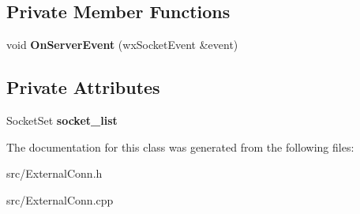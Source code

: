 \subsection*{Private Member Functions}
\begin{DoxyCompactItemize}
\item 
void {\bfseries OnServerEvent} (wxSocketEvent \&event)\label{classExternalConn_a232a60e38f703be5f0664108cb80ee33}

\end{DoxyCompactItemize}
\subsection*{Private Attributes}
\begin{DoxyCompactItemize}
\item 
SocketSet {\bfseries socket\_\-list}\label{classExternalConn_a2f6c014c4bda197cbe2e598bb732ef5f}

\end{DoxyCompactItemize}


The documentation for this class was generated from the following files:\begin{DoxyCompactItemize}
\item 
src/ExternalConn.h\item 
src/ExternalConn.cpp\end{DoxyCompactItemize}
